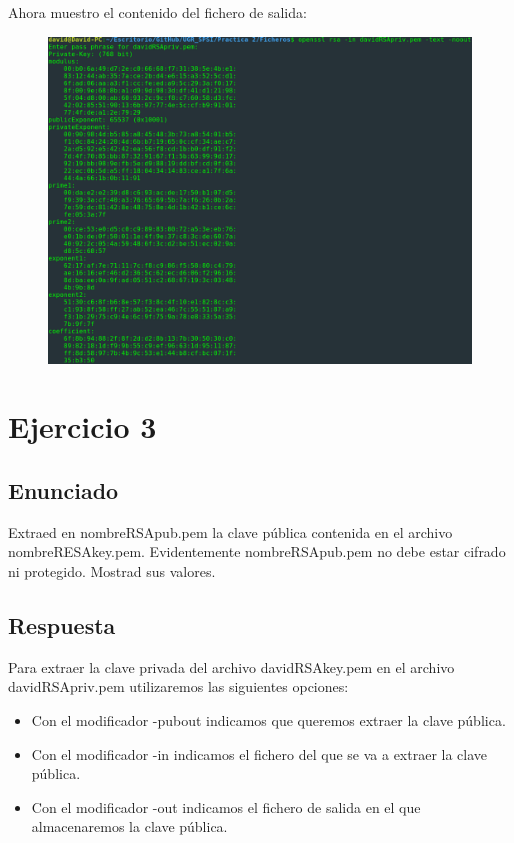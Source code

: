 \documentclass[10pt,a4paper,spanish]{report}
\begin{document}
\newpage
\noindent
Ahora muestro el contenido del fichero de salida:

\begin{figure}[!hbp]
 \centering  \includegraphics[width=1\textwidth]{./Imagenes/2_1.png}
\end{figure}

\chapter{Ejercicio 3}

\section{Enunciado}
\noindent
Extraed en nombreRSApub.pem la clave pública contenida en el archivo nombreRESAkey.pem. Evidentemente nombreRSApub.pem no debe estar cifrado ni protegido. Mostrad sus valores.

\section{Respuesta}
\noindent
Para extraer la clave privada del archivo davidRSAkey.pem en el archivo davidRSApriv.pem utilizaremos las siguientes opciones:

\begin{itemize}
 \item Con el modificador -pubout indicamos que queremos extraer la clave pública.
 \item Con el modificador -in indicamos el fichero del que se va a extraer la clave pública.
 \item Con el modificador -out indicamos el fichero de salida en el que almacenaremos la clave pública.
\end{itemize}
\end{document}
